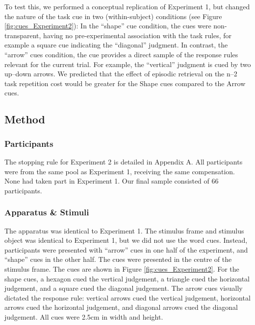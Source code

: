\documentclass[a4paper, doc, natbib]{apa6}
\begin{document}
To test this, we performed a conceptual replication of Experiment 1, but changed the nature of the task cue in two (within-subject) conditions (see Figure \ref{fig:cues_Experiment2}): In the ``shape'' cue condition, the cues were non-transparent, having no pre-experimental association with the task rules, for example a square cue indicating the ``diagonal'' judgment. In contrast, the ``arrow'' cues condition, the cue provides a direct sample of the response rules relevant for the current trial. For example, the ``vertical'' judgment is cued by two up--down arrows. We predicted that the effect of episodic retrieval on the n--2 task repetition cost would be greater for the Shape cues compared to the Arrow cues. 

\subsection{Method}
\subsubsection{Participants}
The stopping rule for Experiment 2 is detailed in Appendix A. All participants were from the same pool as Experiment 1, receiving the same compensation. None had taken part in Experiment 1. Our final sample consisted of 66 participants.

\subsubsection{Apparatus \& Stimuli}
The apparatus was identical to Experiment 1. The stimulus frame and stimulus object was identical to Experiment 1, but we did not use the word cues. Instead, participants were presented with ``arrow'' cues in one half of the experiment, and ``shape'' cues in the other half. The cues were presented in the centre of the stimulus frame. The cues are shown in Figure \ref{fig:cues_Experiment2}. For the shape cues, a hexagon cued the vertical judgement, a triangle cued the horizontal judgement, and a square cued the diagonal judgement. The arrow cues visually dictated the response rule: vertical arrows cued the vertical judgement, horizontal arrows cued the horizontal judgement, and diagonal arrows cued the diagonal judgement. All cues were 2.5cm in width and height.
\end{document}
